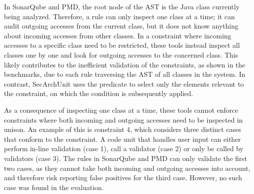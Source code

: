 In SonarQube and PMD, the root node of the AST is the Java class currently being analyzed. Therefore, a rule can only inspect one class at a time; it can audit outgoing accesses from the current class, but it does not know anything about incoming accesses from other classes. In a constraint where incoming accesses to a specific class need to be restricted, these tools instead inspect all classes one by one and look for outgoing accesses to the concerned class.
This likely contributes to the inefficient validation of the constraints, as shown in the benchmarks, due to each rule traversing the AST of all classes in the system. In contrast, SecArchUnit uses the predicate to select only the elements relevant to the constraint, on which the condition is subsequently applied.

%

As a consequence of inspecting one class at a time, these tools cannot enforce constraints where both incoming and outgoing accesses need to be inspected in unison. An example of this is constraint 4, which considers three distinct cases that conform to the constraint. A code unit that handles user input can either perform in-line validation (case 1), call a validator (case 2) or only be called by validators (case 3). The rules in SonarQube and PMD can only validate the first two cases, as they cannot take both incoming and outgoing accesses into account, and therefore risk reporting false positives for the third case. However, no such case was found in the evaluation.

